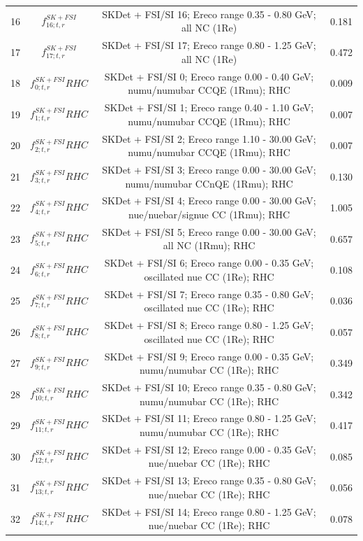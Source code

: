 \begin{tabular} { | c | c | c | c |  }
16 & $f_{16; t, r}^{SK+FSI}$ & SKDet + FSI/SI 16; Ereco range 0.35 - 0.80 GeV; all NC (1Re) & 0.181\\ 
17 & $f_{17; t, r}^{SK+FSI}$ & SKDet + FSI/SI 17; Ereco range 0.80 - 1.25 GeV; all NC (1Re) & 0.472\\ 
18 & $f_{0; t, r}^{SK+FSI}RHC$ & SKDet + FSI/SI  0; Ereco range 0.00 - 0.40 GeV; numu/numubar CCQE (1Rmu); RHC & 0.009\\ 
19 & $f_{1; t, r}^{SK+FSI}RHC$ & SKDet + FSI/SI  1; Ereco range 0.40 - 1.10 GeV; numu/numubar CCQE (1Rmu); RHC & 0.007\\ 
20 & $f_{2; t, r}^{SK+FSI}RHC$ & SKDet + FSI/SI  2; Ereco range 1.10 - 30.00 GeV; numu/numubar CCQE (1Rmu); RHC & 0.007\\ 
21 & $f_{3; t, r}^{SK+FSI}RHC$ & SKDet + FSI/SI  3; Ereco range 0.00 - 30.00 GeV; numu/numubar CCnQE (1Rmu); RHC & 0.130\\ 
22 & $f_{4; t, r}^{SK+FSI}RHC$ & SKDet + FSI/SI  4; Ereco range 0.00 - 30.00 GeV; nue/nuebar/signue CC (1Rmu); RHC & 1.005\\ 
23 & $f_{5; t, r}^{SK+FSI}RHC$ & SKDet + FSI/SI  5; Ereco range 0.00 - 30.00 GeV; all NC (1Rmu); RHC & 0.657\\ 
24 & $f_{6; t, r}^{SK+FSI}RHC$ & SKDet + FSI/SI  6; Ereco range 0.00 - 0.35 GeV; oscillated nue CC (1Re); RHC & 0.108\\ 
25 & $f_{7; t, r}^{SK+FSI}RHC$ & SKDet + FSI/SI  7; Ereco range 0.35 - 0.80 GeV; oscillated nue CC (1Re); RHC & 0.036\\ 
26 & $f_{8; t, r}^{SK+FSI}RHC$ & SKDet + FSI/SI  8; Ereco range 0.80 - 1.25 GeV; oscillated nue CC (1Re); RHC & 0.057\\ 
27 & $f_{9; t, r}^{SK+FSI}RHC$ & SKDet + FSI/SI  9; Ereco range 0.00 - 0.35 GeV; numu/numubar CC (1Re); RHC & 0.349\\ 
28 & $f_{10; t, r}^{SK+FSI}RHC$ & SKDet + FSI/SI 10; Ereco range 0.35 - 0.80 GeV; numu/numubar CC (1Re); RHC & 0.342\\ 
29 & $f_{11; t, r}^{SK+FSI}RHC$ & SKDet + FSI/SI 11; Ereco range 0.80 - 1.25 GeV; numu/numubar CC (1Re); RHC & 0.417\\ 
30 & $f_{12; t, r}^{SK+FSI}RHC$ & SKDet + FSI/SI 12; Ereco range 0.00 - 0.35 GeV; nue/nuebar CC (1Re); RHC & 0.085\\ 
31 & $f_{13; t, r}^{SK+FSI}RHC$ & SKDet + FSI/SI 13; Ereco range 0.35 - 0.80 GeV; nue/nuebar CC (1Re); RHC & 0.056\\ 
32 & $f_{14; t, r}^{SK+FSI}RHC$ & SKDet + FSI/SI 14; Ereco range 0.80 - 1.25 GeV; nue/nuebar CC (1Re); RHC & 0.078\\ 

\end{tabular}
